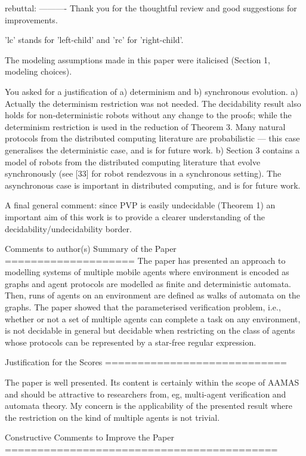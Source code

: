 rebuttal:
----------
Thank you for the thoughtful review and good suggestions for improvements.

'lc' stands for 'left-child' and 'rc' for 'right-child'.

The modeling assumptions made in this paper were italicised (Section 1, modeling choices). 

You asked for a justification of a) determinism and b) synchronous evolution. 
a) Actually the determinism restriction was not needed. The decidability result also holds for non-deterministic robots without any change to the proofs; while the determinism restriction is used in the reduction of Theorem 3. Many natural protocols from the distributed computing literature are probabilistic --- this case generalises the deterministic case, and is for future work.
b) Section 3 contains a model of robots from the distributed computing literature that evolve synchronously (see [33] for robot rendezvous in a synchronous setting). The asynchronous case is important in distributed computing, and is for future work. 

A final general comment: since PVP is easily undecidable (Theorem 1) an important aim of this work is to provide a clearer understanding of the decidability/undecidability border.

Comments to author(s)
Summary of the Paper
====================
The paper has presented an approach to modelling systems of multiple mobile agents where environment is encoded as graphs and agent protocols are modelled as finite and deterministic automata. Then, runs of agents on an environment are defined as walks of automata on the graphs. The paper showed that the parameterised verification problem, i.e., whether or not a set of multiple agents can complete a task on any environment, is not decidable in general but decidable when restricting on the class of agents whose protocols can be represented by a star-free regular expression.

Justification for the Scores
============================

The paper is well presented. Its content is certainly within the scope of AAMAS and should be attractive to researchers from, eg, multi-agent verification and automata theory. My concern is the applicability of the presented result where the restriction on the kind of multiple agents is not trivial.

Constructive Comments to Improve the Paper
==========================================

